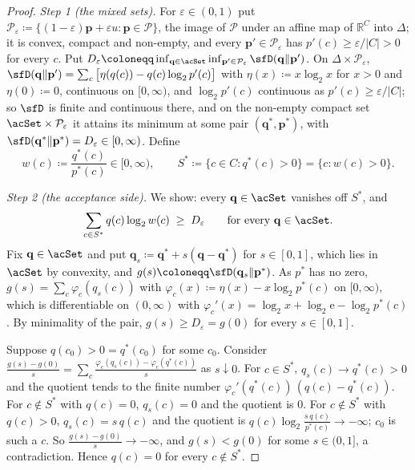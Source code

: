 \begin{proof}
\emph{Step 1 (the mixed sets).} For $\varepsilon\in(0,1)$ put
$\mathcal{P}_{\varepsilon}\coloneqq\{(1-\varepsilon)\mathbf p+\varepsilon u:
\mathbf p\in\mathcal{P}\}$, the image of $\mathcal{P}$ under an affine map
of $\mathbb{R}^{C}$ into $\Delta$; it is convex, compact and non-empty, and
every $\mathbf p'\in\mathcal{P}_{\varepsilon}$ has $p'(c)\ge\varepsilon/|C|>0$
for every $c$. Put $D_{\varepsilon}\coloneqq\inf_{\mathbf q\in\acSet}
\inf_{\mathbf p'\in\mathcal{P}_{\varepsilon}}\sfD(\mathbf q\|\mathbf p')$.
On $\Delta\times\mathcal{P}_{\varepsilon}$,
$\sfD(\mathbf q\|\mathbf p')=\sum_c\big[\eta(q(c))-q(c)\log_2p'(c)\big]$
with $\eta(x)\coloneqq x\log_2x$ for $x>0$ and $\eta(0)\coloneqq0$,
continuous on $[0,\infty)$,
and $\log_2p'(c)$ continuous as $p'(c)\ge\varepsilon/|C|$; so $\sfD$ is
finite and continuous there, and on the non-empty compact set
$\acSet\times\mathcal{P}_{\varepsilon}$ it attains its minimum at some pair
$(\mathbf q^{*},\mathbf p^{*})$, with $\sfD(\mathbf q^{*}\|\mathbf p^{*})
=D_{\varepsilon}\in[0,\infty)$. Define
\begin{equation*}
  w(c)\coloneqq\frac{q^{*}(c)}{p^{*}(c)}\in[0,\infty),\qquad
  S^{*}\coloneqq\{c\in C:q^{*}(c)>0\}=\{c:w(c)>0\}.
\end{equation*}

\emph{Step 2 (the acceptance side).} We show: every $\mathbf q\in\acSet$
vanishes off $S^{*}$, and
\begin{equation}\label{eq:pass-tilt}
  \sum_{c\in S^{*}}q(c)\log_2w(c)\;\ge\;D_{\varepsilon}
  \qquad\text{for every }\mathbf q\in\acSet .
\end{equation}
Fix $\mathbf q\in\acSet$ and put $\mathbf q_s\coloneqq\mathbf q^{*}
+s(\mathbf q-\mathbf q^{*})$ for $s\in[0,1]$, which lies in $\acSet$ by
convexity, and $g(s)\coloneqq\sfD(\mathbf q_s\|\mathbf p^{*})$. As $p^{*}$
has no zero, $g(s)=\sum_c\varphi_c(q_s(c))$ with
$\varphi_c(x)\coloneqq\eta(x)-x\log_2p^{*}(c)$ on $[0,\infty)$, which is
differentiable on $(0,\infty)$ with
$\varphi_c'(x)=\log_2x+\log_2\mathrm e-\log_2p^{*}(c)$. By minimality of the
pair, $g(s)\ge D_{\varepsilon}=g(0)$ for every $s\in[0,1]$.

Suppose $q(c_0)>0=q^{*}(c_0)$ for some $c_0$. Consider
$\frac{g(s)-g(0)}{s}=\sum_c\frac{\varphi_c(q_s(c))-\varphi_c(q^{*}(c))}{s}$
as $s\downarrow0$. For $c\in S^{*}$, $q_s(c)\to q^{*}(c)>0$ and the quotient tends
to the finite number $\varphi_c'(q^{*}(c))\,(q(c)-q^{*}(c))$. For $c\notin S^{*}$
with $q(c)=0$, $q_s(c)=0$ and the quotient is $0$. For $c\notin S^{*}$ with
$q(c)>0$, $q_s(c)=s\,q(c)$ and the quotient is
$q(c)\log_2\frac{s\,q(c)}{p^{*}(c)}\to-\infty$; $c_0$ is such a $c$. So
$\frac{g(s)-g(0)}{s}\to-\infty$, and $g(s)<g(0)$ for some $s\in(0,1]$, a
contradiction. Hence $q(c)=0$ for every $c\notin S^{*}$.


\end{proof}
